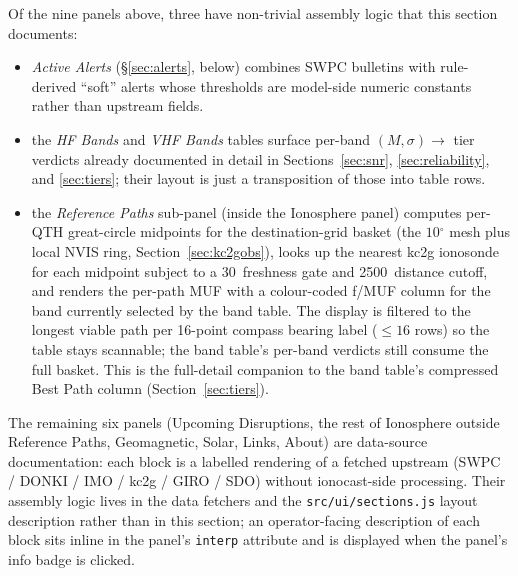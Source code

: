 \documentclass[11pt,a4paper]{article}
\newcommand{\SI}[2]{#1\,\text{#2}}
\newcommand{\km}{\text{km}}
\newcommand{\minute}{\text{min}}
\newcommand{\degree}{\ensuremath{{}^\circ}}
\begin{document}
Of the nine panels above, three have non-trivial assembly logic
that this section documents:
\begin{itemize}[nosep]
  \item \emph{Active Alerts} (\S\ref{sec:alerts}, below) combines
        SWPC bulletins with rule-derived ``soft'' alerts whose
        thresholds are model-side numeric constants rather than
        upstream fields.
  \item the \emph{HF Bands} and \emph{VHF Bands} tables surface
        per-band $(M, \sigma) \to$ tier verdicts already
        documented in detail in Sections~\ref{sec:snr},
        \ref{sec:reliability}, and \ref{sec:tiers}; their layout
        is just a transposition of those into table rows.
  \item the \emph{Reference Paths} sub-panel (inside the
        Ionosphere panel) computes per-QTH great-circle midpoints
        for the destination-grid basket (the $10\degree$ mesh
        plus local NVIS ring, Section~\ref{sec:kc2gobs}), looks
        up the
        nearest kc2g ionosonde for each midpoint subject to a
        \SI{30}{\minute} freshness gate and \SI{2500}{\km}
        distance cutoff, and renders the per-path
        MUF with a colour-coded f/MUF column for the band
        currently selected by the band table.  The display is
        filtered to the longest viable path per 16-point compass
        bearing label
        ($\le 16$ rows) so the table stays scannable; the band
        table's per-band verdicts still consume the
        full basket.  This is the full-detail companion
        to the band table's compressed Best Path column
        (Section~\ref{sec:tiers}).
\end{itemize}
The remaining six panels (Upcoming Disruptions, the rest of
Ionosphere outside Reference Paths, Geomagnetic, Solar, Links,
About)
are data-source documentation: each block
is a labelled rendering of a fetched upstream (SWPC / DONKI / IMO
/ kc2g / GIRO / SDO) without ionocast-side processing.  Their
assembly logic lives in the data fetchers and the
\texttt{src/ui/sections.js} layout description rather than in
this section; an operator-facing description of each block sits
inline in the panel's \texttt{interp} attribute and is displayed
when the panel's info badge is clicked.
\end{document}
